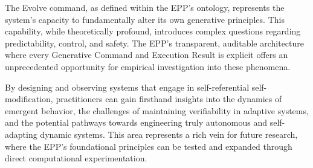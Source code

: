 The Evolve command, as defined within the EPP's ontology, represents the system's capacity to  fundamentally alter its own generative principles. This capability, while theoretically profound, introduces complex questions regarding predictability, control, and safety. The EPP's transparent, auditable  architecture where every Generative Command and Execution Result is explicit offers an unprecedented opportunity for empirical investigation into these phenomena.

By designing and observing systems that engage in self-referential self-modification, practitioners can gain firsthand insights into the dynamics of emergent behavior, the challenges of maintaining verifiability in adaptive systems, and the potential pathways towards engineering truly autonomous and self-adapting dynamic systems. This area represents a rich vein for future research, where the EPP's foundational principles can be tested and expanded through direct computational experimentation.

\newpage
